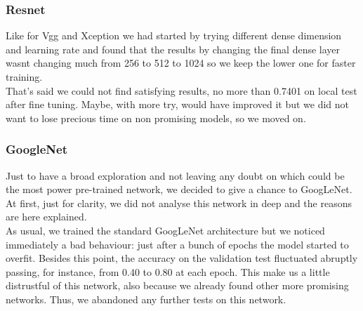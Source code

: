 \documentclass[10pt]{article}
\begin{document}
\subsubsection{Resnet}
Like for Vgg and Xception we had started by trying different dense dimension and learning rate and found that the results by changing the final dense layer wasnt changing much from 256 to 512 to 1024 so we keep the lower one for faster training.\\
That's said we could not find satisfying results, no more than 0.7401 on local test after fine tuning.
Maybe, with more try, would have improved it but we did not want to lose precious time on non promising models, so we moved on.
\subsubsection{GoogleNet}
Just to have a broad exploration and not leaving any doubt on which could be the most power pre-trained network, we decided to give a chance to GoogLeNet. At first, just for clarity, we did not analyse this network in deep and the reasons are here explained.\\[0.1cm]
As usual, we trained the standard GoogLeNet architecture but we noticed immediately a bad behaviour: just after a bunch of epochs the model started to overfit. Besides this point, the accuracy on the validation test fluctuated abruptly passing, for instance, from 0.40 to 0.80 at each epoch. This make us a little distrustful of this network, also because we already found other more promising networks. Thus, we abandoned any further tests on this network.
\end{document}
